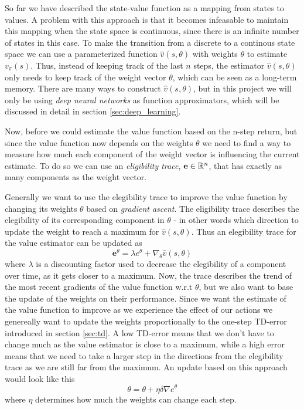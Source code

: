 \documentclass[11pt]{article}
\begin{document}
So far we have described the state-value function as a mapping from states to values.
A problem with this approach is that it becomes infeasable to maintain this mapping
when the state space is continuous, since there is an infinite number of states in this case.
To make the transition from a discrete to a continous state space we can use a
parameterized function $\hat{v}(s, \theta)$ with weights $\theta$
to estimate $v_\pi(s)$.
Thus, instead of keeping track of the last $n$ steps, the estimator $\hat{v}(s, \theta)$
only needs to keep track of the weight vector $\theta$, which can be seen as a long-term memory.
There are many ways to construct $\hat{v}(s, \theta)$, but in this project we will only
be using \textit{deep neural networks} as function approximators,
which will be discussed in detail in section \ref{sec:deep_learning}.

Now, before we could estimate the value function based on the n-step return, but
since the value function now depends on the weights $\theta$ we need to find a way
to measure how much each component of the weight vector is influencing the
current estimate.
To do so we can use an \textit{eligibility trace}, $\mathbf{e} \in \mathbb{R}^n$, that
has exactly as many components as the weight vector.

Generally we want to use the elegibility trace to improve the value function by
changing its weights $\theta$ based on \textit{gradient ascent}.
The eligibility trace describes the elegibility of its corresponding component in $\theta$
- in other words which direction to update the weight to reach a maximum for $\hat{v}(s, \theta)$.
Thus an elegibility trace for the value estimator can be updated as
\begin{equation}
    \mathbf{e}^\theta = \lambda e^\theta + \nabla_\theta \hat{v}(s, \theta)
\end{equation}
where $\lambda$ is a discounting factor used to decrease the elegibility of a component
over time, as it gets closer to a maximum.
Now, the trace describes the trend of the most recent gradients of the value function
w.r.t $\theta$, but we also want to base the update of the weights on their
performance.
Since we want the estimate of the value function to improve as we
experience the effect of our actions we genereally want to
update the weights proportionally to the one-step TD-error introduced in
section \ref{sec:td}.
A low TD-error means that we don't have to change much as the value estimator is
close to a maximum, while a high error means that we need to take a larger step
in the directions from the elegibility trace as we are still far from the maximum.
An update based on this approach would look like this
\begin{equation}
    \theta = \theta + \eta \delta \nabla e^\theta
\end{equation}
where $\eta$ determines how much the weights can change each step.
\end{document}
